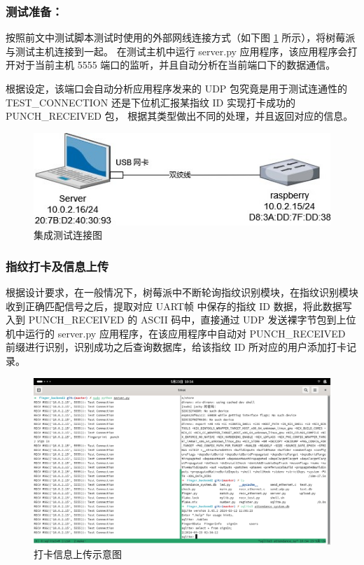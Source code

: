     \subsubsection*{测试准备：}

    按照前文中测试脚本测试时使用的外部网线连接方式（如下图 \ref{集成测试连接图} 所示），将树莓派与测试主机连接到一起。
    在测试主机中运行 server.py 应用程序，该应用程序会打开对于当前主机 5555 端口的监听，并且自动分析在当前端口下的数据通信。


    根据设定，该端口会自动分析应用程序发来的 UDP 包究竟是用于测试连通性的 TEST\_CONNECTION 还是下位机汇报某指纹 ID 实现打卡成功的 PUNCH\_RECEIVED 包，
    根据其类型做出不同的处理，并且返回对应的信息。

    \begin{figure}[ht]
        \centering
        \includegraphics{./imgs/集成测试连接图.jpg}
        \caption{集成测试连接图} \label{集成测试连接图}
    \end{figure}

    \subsubsection{指纹打卡及信息上传}

    根据设计要求，在一般情况下，树莓派中不断轮询指纹识别模块，在指纹识别模块收到正确匹配信号之后，提取对应 UART帧 中保存的指纹 ID 数据，将此数据写入到 PUNCH\_RECEIVED 的
    ASCII 码中，直接通过 UDP 发送裸字节包到上位机中运行的 server.py 应用程序，在该应用程序中自动对 PUNCH\_RECEIVED 前缀进行识别，识别成功之后查询数据库，给该指纹 ID
    所对应的用户添加打卡记录。

    \begin{figure}[ht]
        \centering
        \includegraphics[width=\textwidth]{./imgs/集成测试-打卡信息上传.png}
        \caption{打卡信息上传示意图} \label{打卡信息上传示意图}
    \end{figure}

